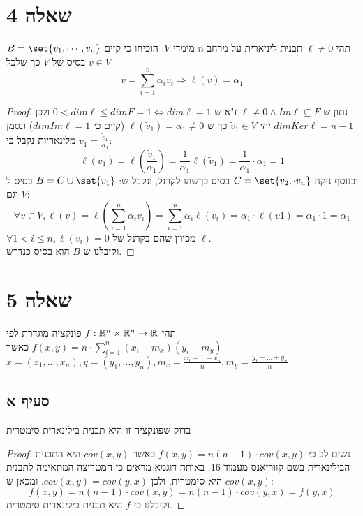 \documentclass{article}
\DeclarePairedDelimiter\set\{\}
\begin{document}
    \section*{שאלה 4}
    תהי $\ell \neq 0$ תבנית ליניארית על מרחב $n$ מימדי $V$.
    הוכיחו כי קיים $B = \set{v_1, \cdots, v_n}$ בסיס של $V$ כך שלכל $v \in V$
    \[
    v = \sum_{i=1}^n \alpha_i v_i \Rightarrow
    \ell(v) = \alpha_1
    \]
    \begin{proof}
    נתון ש $\ell \neq 0 \land Im \ell \subseteq F$ ז"א ש $0 < dim \ell \leq dim F = 1 \Leftrightarrow dim \ell = 1$
    ולכן $dim Ker \ell = n-1$
    יהי $\tilde{v}_1 \in V$ כך ש $\ell(\tilde{v}_1) = \alpha_1 \neq 0$ (קיים כי $dim Im \ell=1$)
    ונסמן $v_1 = \frac{\tilde{v}_1}{\alpha_1}$ מלינאריות נקבל כי:
    \[
    \ell(v_1) = \ell(\frac{\tilde{v}_1}{\alpha_1}) = \frac{1}{\alpha_1} \ell(\tilde{v}_1) = \frac{1}{\alpha_1} \cdot \alpha_1 = 1
    \]
    ובנוסף ניקח $C = \set{v_2, \cdot v_n}$ בסיס כךשהו לקרנל, ונקבל ש: $B = C \cup \set{v_1}$ בסיס ל $V$ וגם:
    \[
    \forall v \in V, \ell(v) = \ell(\sum_{i=1}^n \alpha_i v_i) = \sum_{i=1}^n \alpha_i \ell(v_i) = \alpha_1 \cdot \ell(v1) = \alpha_1 \cdot 1 = \alpha_1
    \]
    $\forall 1 < i \leq n, \ell(v_i) = 0$ מכיוון שהם בקרנל של $\ell$. \\
    וקיבלנו ש $B$ הוא בסיס כנדרש.
    \end{proof}

    \pagebreak
    \section*{שאלה 5}
    תהי $f: \mathbb{R}^n \times \mathbb{R}^n \rightarrow \mathbb{R}$ פונקציה מוגדרת לפי $f(x,y) = n \cdot \sum_{i=1}^n (x_i - m_x)(y_i - m_y)$
    כאשר $x = (x_1, \dotsc, x_n), y = (y_1, \dotsc, y_n), m_x = \frac{x_1 + \dotsc + x_n}{n}, m_y = \frac{y_1 + \dotsc + y_n}{n}$

    \subsection*{סעיף א}
    בדוק שפונקציה זו היא תבנית בילינארית סימטרית
    \begin{proof}
        נשים לב כי $f(x,y) = n(n-1) \cdot cov(x,y)$ כאשר $cov(x,y)$ היא התבנית הבילינארית בשם קווריאנס מעמוד 16.
        באותה דוגמא מראים כי המטריצה המתאימה לתבנית $cov(x,y)$ היא סימטרית, ולכן $cov(x,y) = cov(y,x)$.
        ומכאן ש:
        \[ f(x,y) = n(n-1) \cdot cov(x,y) = n(n-1) \cdot cov(y,x) = f(y,x) \]
        וקיבלנו כי $f$ היא תבנית בילינארית סימטרית.
    \end{proof}
\end{document}

